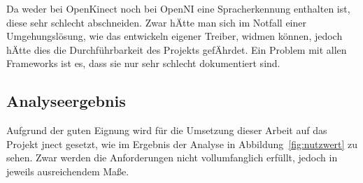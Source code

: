 Da weder bei OpenKinect noch bei OpenNI eine Spracherkennung enthalten ist, diese sehr schlecht abschneiden. Zwar h\"Atte man sich im Notfall einer Umgehungsl\"osung, wie das entwickeln eigener Treiber, widmen k\"onnen, jedoch h\"Atte dies die Durchf\"uhrbarkeit des Projekts gef\"Ahrdet. Ein Problem mit allen Frameworks ist es, dass sie nur sehr schlecht dokumentiert sind.

\subsection{Analyseergebnis}

Aufgrund der guten Eignung wird f\"ur die Umsetzung dieser Arbeit auf das Projekt jnect gesetzt, wie im Ergebnis der Analyse in Abbildung~\ref{fig:nutzwert} zu sehen.
Zwar werden die Anforderungen nicht vollumfanglich erf\"ullt, jedoch in jeweils ausreichendem Ma\ss e. 